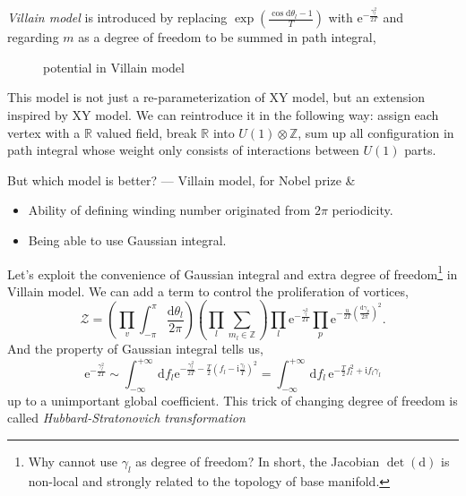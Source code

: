 \emph{Villain model} is introduced by replacing $\exp \left( \frac{\cos \mathrm{d} \theta_{l} - 1}{T} \right)$ with $\mathrm{e}^{- \frac{\gamma_{l}^{2}}{2T}}$ and regarding $m$ as a degree of freedom to be summed in path integral,
\begin{figure}[ht]
    \centering
    \caption{potential in Villain model}
    \label{fig:potential-in-villain-model}
\end{figure}

This model is not just a re-parameterization of XY model, but an extension inspired by XY model. We can reintroduce it in the following way: assign each vertex with a $\mathbb{R}$ valued field, break $\mathbb{R}$ into $U(1) \otimes \mathbb{Z}$, sum up all configuration in path integral whose weight only consists of interactions between $U(1)$ parts.

But which model is better? --- Villain model, for Nobel prize \&
\begin{itemize}
  \item Ability of defining winding number originated from $2\pi $ periodicity.
  \item Being able to use Gaussian integral.
\end{itemize}

Let's exploit the convenience of Gaussian integral and extra degree of freedom\footnote{
  Why cannot use $\gamma_{l}$ as degree of freedom? In short, the Jacobian $\det \left( \mathrm{d}  \right)$ is non-local and strongly related to the topology of base manifold.
} in Villain model. We can add a term to control the proliferation of vortices,
\begin{equation}
  \mathcal{Z} = \left( \prod_{v} \int _{-\pi }^{\pi } \frac{\mathrm{d} \theta_{l}}{2\pi } \right) \left( \prod_{l} \sum_{m_l \in \mathbb{Z}}  \right) \prod_{l} \mathrm{e}^{- \frac{\gamma_{l}^{2}}{2T}} \prod_{p} \mathrm{e}^{- \frac{u}{2T} \left( \frac{\mathrm{d} \gamma_{p}}{2\pi } \right)^{2}}.
\end{equation}
 And the property of Gaussian integral tells us,
\begin{equation}
  \mathrm{e}^{-\frac{\gamma_{l}^{2}}{2T}} \sim \int_{-\infty}^{+\infty} \, \mathrm{d}f_l \mathrm{e}^{- \frac{\gamma_{l}^{2}}{2T} - \frac{T}{2} \left( f_l - \mathrm{i} \frac{\gamma_{l}}{T} \right)^{2}} = \int_{-\infty}^{+\infty} \, \mathrm{d}f_l \,\mathrm{e}^{- \frac{T}{2} f_l^{2} + \mathrm{i} f_l \gamma_{l}}
\end{equation}
up to a unimportant global coefficient.
This trick of changing degree of freedom is called \emph{Hubbard-Stratonovich transformation}

